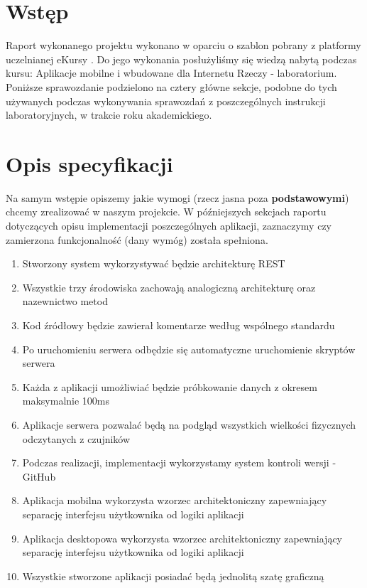 \documentclass[11pt, a4paper]{article}
\institute{Instytut Robotyki i Inteligencji Maszynowej}
\date{01-07-2021}
\begin{document}
\mainpage
\newpage

\tableofcontents
\thispagestyle{fancy}
\newpage

\section*{Wstęp} 
Raport wykonanego projektu wykonano w oparciu o szablon pobrany z platformy uczelnianej eKursy \cite{ekursy}. Do jego wykonania posłużyliśmy się wiedzą nabytą podczas kursu: Aplikacje mobilne i wbudowane dla Internetu Rzeczy - laboratorium. \\
Poniższe sprawozdanie podzielono na cztery główne sekcje, podobne do tych używanych podczas wykonywania sprawozdań z poszczególnych instrukcji laboratoryjnych, w trakcie roku akademickiego.

\section{Opis specyfikacji}
Na samym wstępie opiszemy jakie wymogi (rzecz jasna poza \textbf{podstawowymi}) chcemy zrealizować w naszym projekcie. W późniejszych sekcjach raportu dotyczących opisu implementacji poszczególnych aplikacji, zaznaczymy czy zamierzona funkcjonalność (dany wymóg) została spełniona.
\begin{enumerate}
\item Stworzony system wykorzystywać będzie architekturę REST
\item Wszystkie trzy środowiska zachowają analogiczną architekturę oraz nazewnictwo metod
\item Kod źródłowy będzie zawierał komentarze według wspólnego standardu
\item Po uruchomieniu serwera odbędzie się automatyczne uruchomienie skryptów serwera
\item Każda z aplikacji umożliwiać będzie próbkowanie danych z okresem maksymalnie 100ms
\item Aplikacje serwera pozwalać będą na podgląd wszystkich wielkości fizycznych odczytanych z czujników
\item Podczas realizacji, implementacji wykorzystamy system kontroli wersji - GitHub
\item Aplikacja mobilna wykorzysta wzorzec architektoniczny zapewniający separację interfejsu użytkownika od logiki aplikacji
\item Aplikacja desktopowa wykorzysta wzorzec architektoniczny zapewniający separację interfejsu użytkownika od logiki aplikacji
\item Wszystkie stworzone aplikacji posiadać będą jednolitą szatę graficzną
\end{enumerate}
\end{document}
